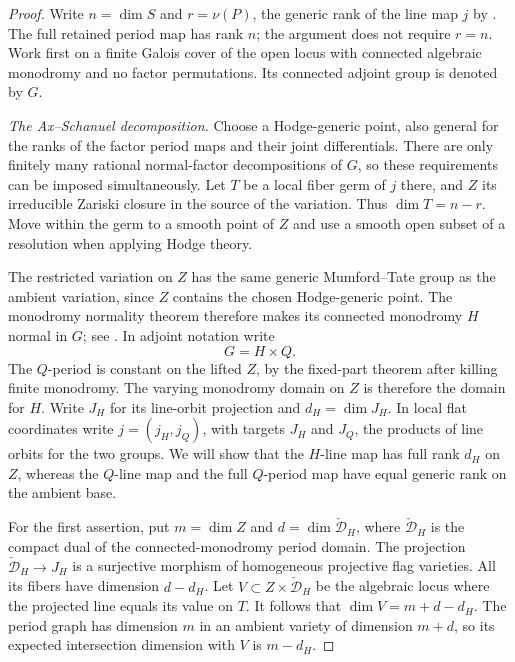 \begin{proof}
Write $n=\dim S$ and $r=\nu(P)$, the generic rank of the line map
$j$ by . The full retained period map has rank
$n$; the argument does not require $r=n$.
Work first on a finite Galois cover of the
open locus with connected algebraic monodromy and no factor
permutations.  Its connected adjoint group is denoted by $G$.

\smallskip\noindent
\emph{The Ax--Schanuel decomposition.}
Choose a Hodge-generic point, also general for the ranks of the
factor period maps and their joint differentials.  There are only
finitely many rational normal-factor decompositions of $G$, so
these requirements can be imposed simultaneously.  Let $T$ be a
local fiber germ of $j$ there, and $Z$ its irreducible Zariski
closure in the source of the variation.  Thus $\dim T=n-r$.
Move within the germ to a smooth point of $Z$ and use a smooth
open subset of a resolution when applying Hodge theory.

The restricted variation on $Z$ has the same generic Mumford--Tate
group as the ambient variation, since $Z$ contains the chosen
Hodge-generic point.  The monodromy normality theorem therefore
makes its connected monodromy $H$ normal in $G$; see
\cite[\S5, Theorem~1]{AndreMonodromy}.  In adjoint notation write
\[
                            G=H\times Q.
\]
The $Q$-period is constant on the lifted $Z$, by the fixed-part
theorem after killing finite monodromy.  The varying monodromy
domain on $Z$ is therefore the domain for $H$.  Write $J_H$ for
its line-orbit projection and $d_H=\dim J_H$.
In local flat coordinates write $j=(j_H,j_Q)$, with targets $J_H$
and $J_Q$, the products of line orbits for the two groups.  We will
show that the $H$-line map has full rank $d_H$ on $Z$, whereas the
$Q$-line map and the full $Q$-period map have equal generic rank
on the ambient base.

For the first assertion, put
$m=\dim Z$ and $d=\dim\check{\mathcal D}_H$, where
$\check{\mathcal D}_H$ is the compact dual of the connected-monodromy
period domain.  The projection
$\check{\mathcal D}_H\to J_H$ is a surjective morphism of
homogeneous projective flag varieties.  All its fibers have
dimension $d-d_H$.  Let
$V\subset Z\times\check{\mathcal D}_H$ be the algebraic locus
where the projected line equals its value on $T$.  It follows that
$\dim V=m+d-d_H$.  The period graph has dimension $m$ in an
ambient variety of dimension $m+d$, so its expected intersection
dimension with $V$ is $m-d_H$.


\end{proof}
